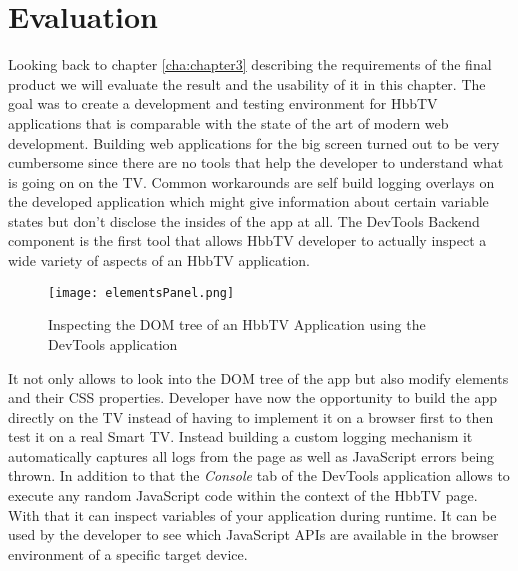 
\chapter{Evaluation\label{cha:chapter6}}

Looking back to chapter \ref{cha:chapter3} describing the requirements of the final product we will
evaluate the result and the usability of it in this chapter. The goal was to create a development
and testing environment for HbbTV applications that is comparable with the state of the art of
modern web development. Building web applications for the big screen turned out to be very cumbersome
since there are no tools that help the developer to understand what is going on on the TV. Common
workarounds are self build logging overlays on the developed application which might give information
about certain variable states but don't disclose the insides of the app at all. The DevTools Backend
component is the first tool that allows HbbTV developer to actually inspect a wide variety of aspects
of an HbbTV application.

\begin{figure}[htb]
  \centering
  \hspace*{-0.7cm}
  \texttt{[image: elementsPanel.png]}\\
  \caption{Inspecting the DOM tree of an HbbTV Application using the DevTools application}\label{fig:elementsPanel}
\end{figure}

It not only allows to look into the DOM tree of the app but also modify elements and their CSS
properties. Developer have now the opportunity to build the app directly on the TV instead of
having to implement it on a browser first to then test it on a real Smart TV. Instead building
a custom logging mechanism it automatically captures all logs from the page as well as JavaScript
errors being thrown. In addition to that the \textit{Console} tab of the DevTools application
allows to execute any random JavaScript code within the context of the HbbTV page. With that it
can inspect variables of your application during runtime. It can be used by the developer to see
which JavaScript APIs are available in the browser environment of a specific target device.

